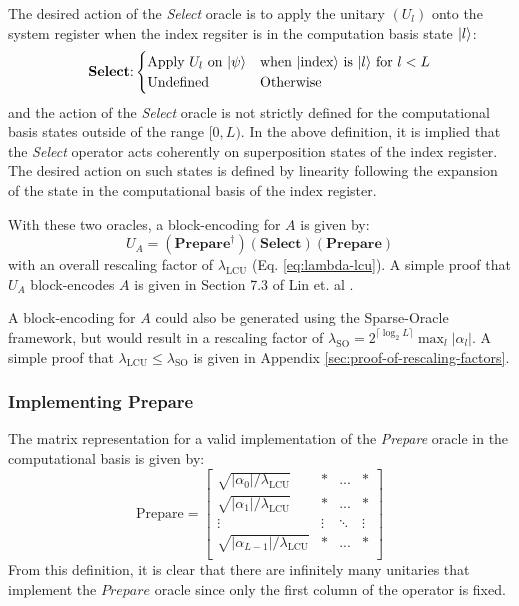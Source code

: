The desired action of the \textit{Select} oracle is to apply the unitary $(U_l)$ onto the system register when the index regsiter is in the computation basis state $\ket{l}$:
\begin{equation}
    \label{eq:select}
    \textbf{Select}\text{:} 
    \begin{cases} 
        \text{Apply $U_l$ on $\ket{\psi}$} & \text{when $\ket{\text{index}}$ is $\ket{l}$ for $l < L$} \\
        \text{Undefined} & \text{Otherwise} \\
    \end{cases}
\end{equation}
and the action of the \textit{Select} oracle is not strictly defined for the computational basis states outside of the range $[0, L)$.
In the above definition, it is implied that the \textit{Select} operator acts coherently on superposition states of the index register.
The desired action on such states is defined by linearity following the expansion of the state in the computational basis of the index register.

With these two oracles, a block-encoding for $A$ is given by:
\begin{equation}
    \label{eq:lcu-be}
    U_A = (\textbf{Prepare}^\dagger) (\textbf{Select}) (\textbf{Prepare})
\end{equation}
with an overall rescaling factor of $\lambda_\text{LCU}$ (Eq. \ref{eq:lambda-lcu}).
A simple proof that $U_A$ block-encodes $A$ is given in Section 7.3 of Lin et. al \cite{lin2022lecture}.

A block-encoding for $A$ could also be generated using the Sparse-Oracle framework, but would result in a rescaling factor of $\lambda_\text{SO} = 2^{\lceil \log_2L \rceil} \max_l |\alpha_l|$.
A simple proof that $\lambda_\text{LCU} \leq \lambda_\text{SO}$ is given in Appendix \ref{sec:proof-of-rescaling-factors}.

\subsubsection{Implementing \textbf{Prepare}}

The matrix representation for a valid implementation of the \textit{Prepare} oracle in the computational basis is given by:
\begin{equation}
    \text{Prepare} = \begin{bmatrix}
        \sqrt{|\alpha_0| / \lambda_\text{LCU}} & * & ... & * \\
        \sqrt{|\alpha_1| / \lambda_\text{LCU}} & * & ... & * \\
        \vdots & \vdots & \ddots & \vdots \\
        \sqrt{|\alpha_{L-1} |/ \lambda_\text{LCU}} & * & ... & * \\
    \end{bmatrix}
\end{equation}
From this definition, it is clear that there are infinitely many unitaries that implement the $\textit{Prepare}$ oracle since only the first column of the operator is fixed.

